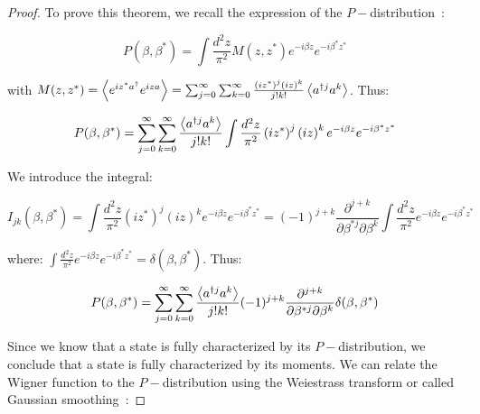 \begin{proof}
To prove this theorem, we recall the expression of the $P-$distribution~\cite{khan2021physical}:

\begin{equation}
    P(\beta, \beta^*) = \int \frac{d^2z}{\pi^2} M(z, z^*) e^{-i \beta z}e^{-i \beta^* z^*}
\end{equation}

with $M(z, z^*) = \left\langle e^{i z^* a^\dagger} e^{i z a} \right\rangle = \sum_{j=0}^\infty \sum_{k=0}^\infty \frac{\left(i z^*\right)^j \left(i z\right)^k}{j! k!} \left\langle a^{\dagger j} a^k \right\rangle$. Thus:

\begin{equation} 
    P(\beta, \beta^*) =  \sum_{j=0}^\infty \sum_{k=0}^\infty \frac{\left\langle a^{\dagger j} a^k \right\rangle}{j! k!} \int \frac{d^2z}{\pi^2} \left(i z^*\right)^j \left(i z\right)^k e^{-i \beta z}e^{-i \beta^* z^*}
\end{equation}

We introduce the integral:

\begin{equation}
    I_{j k}(\beta, \beta^*) =  \int \frac{d^2z}{\pi^2} \left(i z^*\right)^j \left(i z\right)^k e^{-i \beta z}e^{-i \beta^* z^*} = (-1)^{j+k} \frac{\partial^{j+k}}{\partial \beta^{* j} \partial \beta^k} \int \frac{d^2z}{\pi^2} e^{-i \beta z}e^{-i \beta^* z^*}
\end{equation}

where: $\int \frac{d^2z}{\pi^2} e^{-i \beta z}e^{-i \beta^* z^*} = \delta(\beta, \beta^*)$. Thus:

\begin{equation}
    P(\beta, \beta^*) =  \sum_{j=0}^\infty \sum_{k=0}^\infty \frac{\left\langle a^{\dagger j} a^k \right\rangle}{j! k!} (-1)^{j+k} \frac{\partial^{j+k}}{\partial \beta^{* j} \partial \beta^k}  \delta(\beta, \beta^*)
\end{equation}

Since we know that a state is fully characterized by its $P-$distribution, we conclude that a state is fully characterized by its moments. We can relate the Wigner function to the $P-$distribution using the Weiestrass transform or called Gaussian smoothing~\cite{weiestrass_trans_ref}:


\end{proof}
